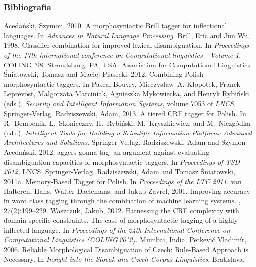 \documentclass[xcolor=dvipsnames,polish]{beamer}
\begin{document}
\begin{frame}[allowframebreaks]
  \frametitle{Bibliografia}
  \begin{thebibliography}{10}
  \beamertemplatebookbibitems
Acedański, Szymon, 2010.
\newblock A morphosyntactic {B}rill tagger for inflectional languages.
\newblock In {\em Advances in Natural Language Processing\/}.
  \beamertemplatearticlebibitems
Brill, Eric and Jun Wu, 1998.
\newblock Classifier combination for improved lexical disambiguation.
\newblock In {\em Proceedings of the 17th international conference on
  Computational linguistics - Volume 1\/}, COLING '98. Stroudsburg, PA, USA:
  Association for Computational Linguistics.
  \beamertemplatearticlebibitems
Śniatowski, Tomasz and Maciej Piasecki, 2012.
\newblock Combining {P}olish morphosyntactic taggers.
\newblock In Pascal Bouvry, Mieczysław~A. Kłopotek, Franck Leprévost,
  Małgorzata Marciniak, Agnieszka Mykowiecka, and Henryk Rybiński (eds.),
  {\em Security and Intelligent Information Systems\/}, volume 7053 of {\em
  LNCS\/}. Springer-Verlag.
  \beamertemplatearticlebibitems
Radziszewski, Adam, 2013.
\newblock A tiered {CRF} tagger for {P}olish.
\newblock In R.~Bembenik, {\L}.~Skonieczny, H.~Rybi\'{n}ski, M.~Kryszkiewicz,
  and M.~Niezg{\'o}dka (eds.), {\em Intelligent Tools for Building a Scientific
  Information Platform: Advanced Architectures and Solutions\/}. Springer
  Verlag.
  \beamertemplatearticlebibitems
Radziszewski, Adam and Szymon Acedański, 2012.
aggers gonna tag: an argument against evaluating disambiguation
  capacities of morphosyntactic taggers.
\newblock In {\em Proceedings of TSD 2012\/}, LNCS. Springer-Verlag.
\beamertemplatearticlebibitems
{}
Radziszewski, Adam and Tomasz Śniatowski, 2011a.
 {M}emory-{B}ased {T}agger for {P}olish.
\newblock In {\em Proceedings of the LTC 2011\/}.
\beamertemplatearticlebibitems
{}
van Halteren, Hans, Walter Daelemans, and Jakub Zavrel, 2001.
\newblock Improving accuracy in word class tagging through the combination of
  machine learning systems.
, 27(2):199--229.
\beamertemplatearticlebibitems
{}
Waszczuk, Jakub, 2012.
\newblock Harnessing the {CRF} complexity with domain-specific constraints.
  {T}he case of morphosyntactic tagging of a highly inflected language.
\newblock In {\em Proceedings of the 24th International Conference on
  Computational Linguistics ({COLING}\,2012)\/}. Mumbai, India.
\beamertemplatearticlebibitems
{}
Petkevič Vladimír, 2006.
\newblock Reliable {M}orphological {D}isambiguation of {C}zech: {R}ule-{B}ased {A}pproach is {N}ecessary.
\newblock In {\em Insight into the Slovak and Czech Corpus Linguistics}, Bratislava.


\end{thebibliography}
\end{frame}
\end{document}
